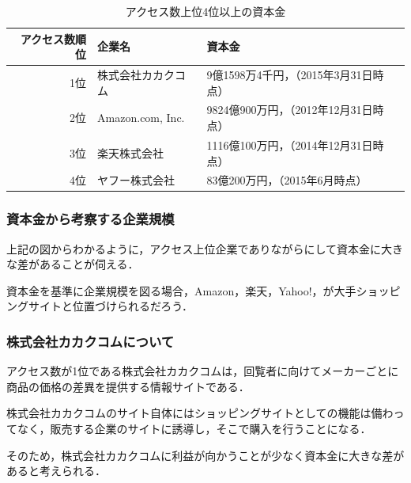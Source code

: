 \begin{table}[htb]
\label{アクセス数上位4位以上の資本金}
    \caption{アクセス数上位4位以上の資本金}

\newlength{\shihonkin}
\setlength{\shihonkin}{0.7cm}
  \begin{center}

\begin{tabular}{|r|p{12em}|p{20em}|}

	\hline
	アクセス数順位 & 企業名 & 資本金  \\
	\hline
	\parbox[c][\shihonkin][c]{0cm}{}
	1位 & 株式会社カカクコム & 9億1598万4千円，（2015年3月31日時点）  \\
	\hline
	\parbox[c][\shihonkin][c]{0cm}{}
	2位 & Amazon.com, Inc. & 9824億900万円，（2012年12月31日時点）  \\
	\hline
	\parbox[c][\shihonkin][c]{0cm}{}
	3位 & 楽天株式会社 & 1116億100万円，（2014年12月31日時点）  \\
	\hline
	\parbox[c][\shihonkin][c]{0cm}{}
	4位 & ヤフー株式会社 & 83億200万円，（2015年6月時点）  \\
	\hline
    \end{tabular}
  \end{center}
\end{table}


\subsubsection{資本金から考察する企業規模}

上記の図からわかるように，アクセス上位企業でありながらにして資本金に大きな差があることが伺える．

資本金を基準に企業規模を図る場合，Amazon，楽天，Yahoo!，が大手ショッピングサイトと位置づけられるだろう．

\subsubsection{株式会社カカクコムについて}
アクセス数が1位である株式会社カカクコムは，回覧者に向けてメーカーごとに商品の価格の差異を提供する情報サイトである．

株式会社カカクコムのサイト自体にはショッピングサイトとしての機能は備わってなく，販売する企業のサイトに誘導し，そこで購入を行うことになる．

そのため，株式会社カカクコムに利益が向かうことが少なく資本金に大きな差があると考えられる．





